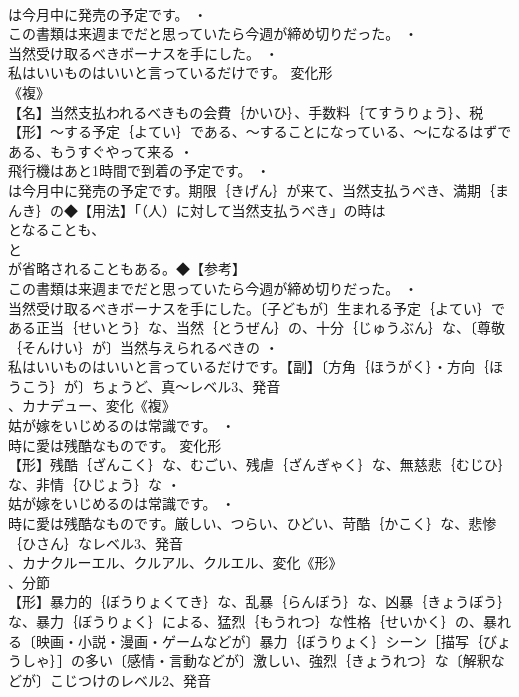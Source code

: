 \documentclass[8pt]{extreport}
\begin{document}
\begin{CJK}{UTF8}{min}
\\	は今月中に発売の予定です。 ・
\\	この書類は来週までだと思っていたら今週が締め切りだった。 ・
\\	当然受け取るべきボーナスを手にした。 ・
\\	私はいいものはいいと言っているだけです。	変化形 
\\	《複》
\\	【名】当然支払われるべきもの会費｛かいひ｝、手数料｛てすうりょう｝、税【形】～する予定｛よてい｝である、～することになっている、～になるはずである、もうすぐやって来る ・
\\	飛行機はあと1時間で到着の予定です。 ・
\\	は今月中に発売の予定です。期限｛きげん｝が来て、当然支払うべき、満期｛まんき｝の◆【用法】「（人）に対して当然支払うべき」の時は
\\	となることも、
\\	と
\\	が省略されることもある。◆【参考】
\\	この書類は来週までだと思っていたら今週が締め切りだった。 ・
\\	当然受け取るべきボーナスを手にした。〔子どもが〕生まれる予定｛よてい｝である正当｛せいとう｝な、当然｛とうぜん｝の、十分｛じゅうぶん｝な、〔尊敬｛そんけい｝が〕当然与えられるべきの ・
\\	私はいいものはいいと言っているだけです。【副】〔方角｛ほうがく｝・方向｛ほうこう｝が〕ちょうど、真～レベル3、発音
\\	、カナデュー、変化《複》
\\	姑が嫁をいじめるのは常識です。 ・
\\	時に愛は残酷なものです。	変化形 
\\	【形】残酷｛ざんこく｝な、むごい、残虐｛ざんぎゃく｝な、無慈悲｛むじひ｝な、非情｛ひじょう｝な ・
\\	姑が嫁をいじめるのは常識です。 ・
\\	時に愛は残酷なものです。厳しい、つらい、ひどい、苛酷｛かこく｝な、悲惨｛ひさん｝なレベル3、発音
\\	、カナクルーエル、クルアル、クルエル、変化《形》
\\	、分節
\\	【形】暴力的｛ぼうりょくてき｝な、乱暴｛らんぼう｝な、凶暴｛きょうぼう｝な、暴力｛ぼうりょく｝による、猛烈｛もうれつ｝な性格｛せいかく｝の、暴れる〔映画・小説・漫画・ゲームなどが〕暴力｛ぼうりょく｝シーン［描写｛びょうしゃ｝］の多い〔感情・言動などが〕激しい、強烈｛きょうれつ｝な〔解釈などが〕こじつけのレベル2、発音

\end{CJK}
\end{document}
